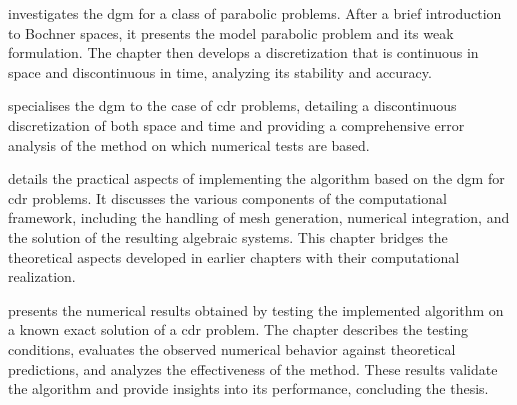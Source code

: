  investigates the \acrshort{dgm} for a class of parabolic problems. After a brief introduction to Bochner spaces, it presents the model parabolic problem and its weak formulation. The chapter then develops a discretization that is continuous in space and discontinuous in time, analyzing its stability and accuracy.

 specialises the \acrshort{dgm} to the case of \acrfull{cdr} problems, detailing a discontinuous discretization of both space and time and providing a comprehensive error analysis of the method on which numerical tests are based.

 details the practical aspects of implementing the algorithm based on the \acrshort{dgm} for \acrshort{cdr} problems. It discusses the various components of the computational framework, including the handling of mesh generation, numerical integration, and the solution of the resulting algebraic systems. This chapter bridges the theoretical aspects developed in earlier chapters with their computational realization.

 presents the numerical results obtained by testing the implemented algorithm on a known exact solution of a \acrshort{cdr} problem. The chapter describes the testing conditions, evaluates the observed numerical behavior against theoretical predictions, and analyzes the effectiveness of the method. These results validate the algorithm and provide insights into its performance, concluding the thesis.